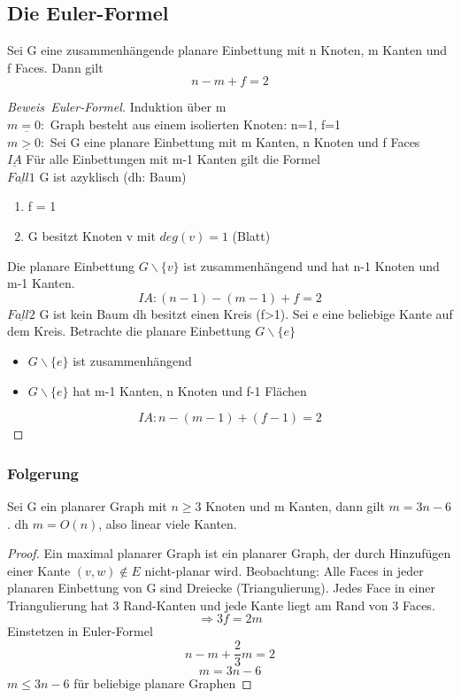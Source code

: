 \subsection{Die Euler-Formel}
Sei G eine zusammenhängende planare Einbettung mit n Knoten, m Kanten und f Faces. Dann gilt
$$ n - m + f = 2 $$
\newpage
\begin{proof}[Beweis\ Euler-Formel]
Induktion über m\\
$\underline{m = 0:} $ Graph besteht aus einem isolierten Knoten: n=1, f=1  \\
$\underline{m > 0:} $ Sei G eine planare Einbettung mit m Kanten, n Knoten und f Faces \\
$\underline{IA} $ Für alle Einbettungen mit m-1 Kanten gilt die Formel \\
$\underline{Fall 1} $ G ist azyklisch (dh: Baum) 
\begin{enumerate}
    \item f = 1
    \item G besitzt Knoten v mit $ deg(v)=1 $ (Blatt)
\end{enumerate}
Die planare Einbettung $ G\backslash \{v\} $ ist zusammenhängend und hat n-1 Knoten und m-1 Kanten. 
$$ IA: (n-1) - (m-1) + f = 2 $$
$\underline{Fall 2} $ G ist kein Baum dh besitzt einen Kreis (f>1). Sei e eine beliebige Kante auf dem Kreis. Betrachte die planare Einbettung $ G\backslash \{e\} $

\begin{itemize}
    \item $ G\backslash \{e\} $ ist zusammenhängend
    \item $ G\backslash \{e\} $ hat m-1 Kanten, n Knoten und f-1 Flächen
\end{itemize}
$$ IA: n - (m-1) + (f - 1) = 2 $$

\end{proof}

\subsubsection{Folgerung}
Sei G ein planarer Graph mit $ n \geq 3 $ Knoten und m Kanten, dann gilt $ m = 3n-6 $. dh $ m=O(n) $, also linear viele Kanten.
\begin{proof}
Ein maximal planarer Graph ist ein planarer Graph, der durch Hinzufügen einer Kante $ (v,w) \notin E $ nicht-planar wird. Beobachtung: Alle Faces in jeder planaren Einbettung von G sind Dreiecke (Triangulierung). Jedes Face in einer Triangulierung hat 3 Rand-Kanten und jede Kante liegt am Rand von 3 Faces. 
$$\Rightarrow 3f = 2m $$
Einstetzen in Euler-Formel
$$ n - m + \frac{2}{3}m = 2$$
$$ m = 3n-6$$
$ m \leq 3n-6 $ für beliebige planare Graphen
\end{proof}

